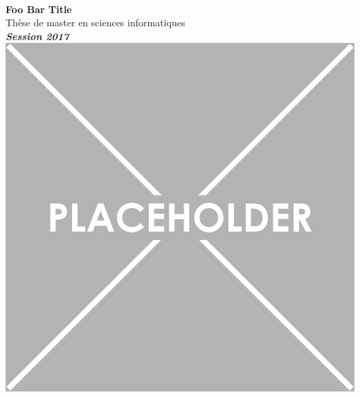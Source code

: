 \begin{titlepage}

\begin{minipage}{1\textwidth}
\hspace{-0.048\textwidth}  %
\hspace{0.316\textwidth}
\end{minipage}

\begin{center}



~\\[2.5cm]

{ \Large \bfseries Foo Bar Title}\\[1.3cm]

{\Large Thèse de master en sciences informatiques}\\[0.5cm]
\textbf{\textit{Session 2017}}\\[1.5cm]


\includegraphics[scale=0.3]{images/placeholder.png} \\[2cm]



\end{center}
\end{titlepage}
